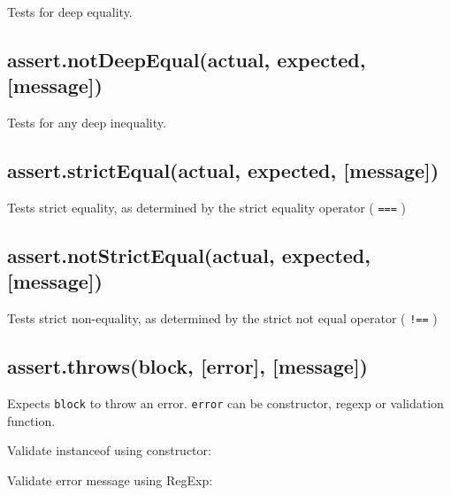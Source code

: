 Tests for deep equality.

\subsection{assert.notDeepEqual(actual, expected,
{[}message{]})}\label{assert.notdeepequalactual-expected-message}

Tests for any deep inequality.

\subsection{assert.strictEqual(actual, expected,
{[}message{]})}\label{assert.strictequalactual-expected-message}

Tests strict equality, as determined by the strict equality operator (
\texttt{===} )

\subsection{assert.notStrictEqual(actual, expected,
{[}message{]})}\label{assert.notstrictequalactual-expected-message}

Tests strict non-equality, as determined by the strict not equal
operator ( \texttt{!==} )

\subsection{assert.throws(block, {[}error{]},
{[}message{]})}\label{assert.throwsblock-error-message}

Expects \texttt{block} to throw an error. \texttt{error} can be
constructor, regexp or validation function.

Validate instanceof using constructor:

\begin{Shaded}
\begin{Highlighting}[]
\NormalTok{(}
  \NormalTok{() \{}
      \NormalTok{(}\NormalTok{);}
  \NormalTok{\},}
\NormalTok{);}
\end{Highlighting}
\end{Shaded}

Validate error message using RegExp:

\begin{Shaded}
\begin{Highlighting}[]
\NormalTok{(}
  \NormalTok{() \{}
      \NormalTok{(}\NormalTok{);}
  \NormalTok{\},}
\NormalTok{);}
\end{Highlighting}
\end{Shaded}

